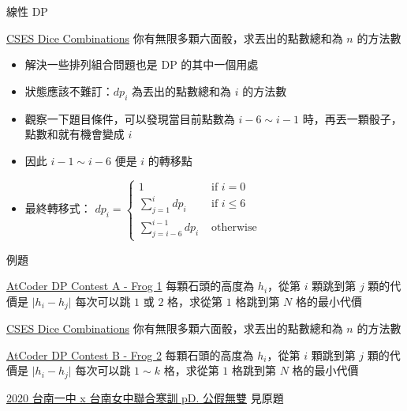 \documentclass[aspectratio=169]{beamer}
\begin{document}
    \begin{frame}{線性 DP}
        \begin{block}{\href{https://cses.fi/problemset/task/1633}{CSES Dice Combinations}}
            你有無限多顆六面骰，求丟出的點數總和為 $n$ 的方法數
        \end{block}

        \begin{itemize}
            \item<1-> 解決一些排列組合問題也是 DP 的其中一個用處
            \item<2-> 狀態應該不難訂：$dp_i$ 為丟出的點數總和為 $i$ 的方法數
            \item<3-> 觀察一下題目條件，可以發現當目前點數為 $i - 6 \sim i - 1$ 時，再丟一顆骰子，點數和就有機會變成 $i$
            \item<4-> 因此 $i - 1 \sim i - 6$ 便是 $i$ 的轉移點
            \item<5-> 最終轉移式：
            $dp_i = \begin{cases}
                1 & \text{ if } i = 0 \\
                \displaystyle\sum_{j = 1}^{i}{dp_i} & \text{ if } i \le 6 \\
                \displaystyle\sum_{j = i - 6}^{i - 1}{dp_i} & \text{ otherwise }
            \end{cases}$
        \end{itemize}
    \end{frame}

    \begin{frame}{例題}
        \begin{block}{\href{https://atcoder.jp/contests/dp/tasks/dp_a}{AtCoder DP Contest A - Frog 1}}
            每顆石頭的高度為 $h_i$，從第 $i$ 顆跳到第 $j$ 顆的代價是 $\lvert h_i - h_j \rvert$ 每次可以跳 $1$ 或 $2$ 格，求從第 $1$ 格跳到第 $N$ 格的最小代價
        \end{block}

        \begin{block}{\href{https://cses.fi/problemset/task/1633}{CSES Dice Combinations}}
            你有無限多顆六面骰，求丟出的點數總和為 $n$ 的方法數
        \end{block}

        \begin{block}{\href{https://atcoder.jp/contests/dp/tasks/dp_b}{AtCoder DP Contest B - Frog 2}}
            每顆石頭的高度為 $h_i$，從第 $i$ 顆跳到第 $j$ 顆的代價是 $\lvert h_i - h_j \rvert$ 每次可以跳 $1 \sim k$ 格，求從第 $1$ 格跳到第 $N$ 格的最小代價
        \end{block}

        \begin{block}{\href{https://toj.tfcis.org/oj/pro/470/}{2020 台南一中 x 台南女中聯合寒訓 pD. 公假無雙}}
            見原題
        \end{block}
    \end{frame}
\end{document}

